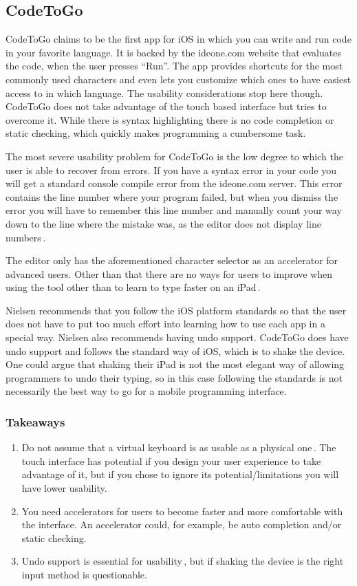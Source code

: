 \subsection{CodeToGo}
CodeToGo claims to be the first app for iOS in which you can write and run code in your favorite language. It is backed by the ideone.com website that evaluates the code, when the user presses “Run”. The app provides shortcuts for the most commonly used characters and even lets you customize which ones to have easiest access to in which language. The usability considerations stop here though. CodeToGo does not take advantage of the touch based interface but tries to overcome it. While there is syntax highlighting there is no code completion or static checking, which quickly makes programming a cumbersome task.

The most severe usability problem for CodeToGo is the low degree to which the user is able to recover from errors. If you have a syntax error in your code you will get a standard console compile error from the ideone.com server. This error contains the line number where your program failed, but when you dismiss the error you will have to remember this line number and manually count your way down to the line where the mistake was, as the editor does not display line numbers\,\cite{nielsen1990heuristic}.

The editor only has the aforementioned character selector as an accelerator for advanced users. Other than that there are no ways for users to improve when using the tool other than to learn to type faster on an iPad\,\cite{nielsen1990heuristic}.

Nielsen  recommends that you follow the iOS platform standards so that the user does not have to put too much effort into learning how to use each app in a special way. Nielsen also recommends having undo support. CodeToGo does have undo support and follows the standard way of iOS, which is to shake the device. One could argue that shaking their iPad is not the most elegant way of allowing programmers to undo their typing, so in this case following the standards is not necessarily the best way to go for a mobile programming interface.

\subsubsection{Takeaways}
\begin{enumerate}
	\item Do not assume that a virtual keyboard is as usable as a physical one\,\cite{nielsen2013mobile}. The touch interface has potential if you design your user experience to take advantage of it, but if you chose to ignore its potential/limitations you will have lower usability.
	\item You need accelerators for users to become faster and more comfortable with the interface. An accelerator could, for example, be auto completion and/or static checking.
	\item Undo support is essential for usability\,\cite{nielsen1990heuristic}, but if shaking the device is the right input method is questionable.
\end{enumerate}


